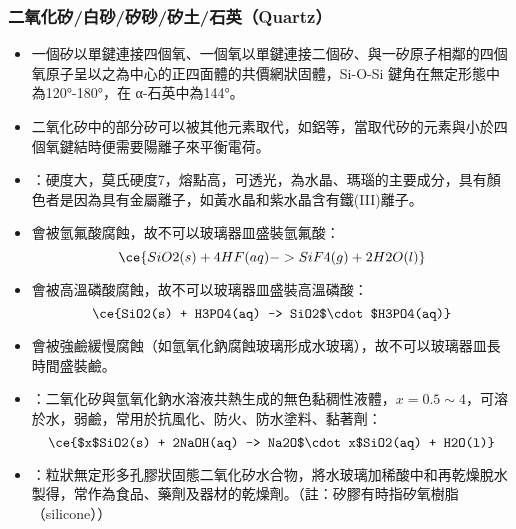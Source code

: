 \documentclass[a4paper,12pt]{report}
\begin{document}
\subsubsection{二氧化矽/白砂/矽砂/矽土/石英（Quartz）}
\begin{itemize}
\item 一個矽以單鍵連接四個氧、一個氧以單鍵連接二個矽、與一矽原子相鄰的四個氧原子呈以之為中心的正四面體的共價網狀固體，Si-O-Si 鍵角在無定形態中為120°-180°，在 α-石英中為144°。
\item 二氧化矽中的部分矽可以被其他元素取代，如鋁等，當取代矽的元素與小於四個氧鍵結時便需要陽離子來平衡電荷。
\item {}：硬度大，莫氏硬度7，熔點高，可透光，為水晶、瑪瑙的主要成分，具有顏色者是因為具有金屬離子，如黃水晶和紫水晶含有鐵(III)離子。
\item 會被氫氟酸腐蝕，故不可以玻璃器皿盛裝氫氟酸：
\[\ce{SiO2(s) + 4HF(aq) -> SiF4(g) + 2H2O(l)}\]
\item 會被高溫磷酸腐蝕，故不可以玻璃器皿盛裝高溫磷酸：
\[\ce{SiO2(s) + H3PO4(aq) -> SiO2$\cdot$H3PO4(aq)}\]
\item 會被強鹼緩慢腐蝕（如氫氧化鈉腐蝕玻璃形成水玻璃），故不可以玻璃器皿長時間盛裝鹼。
\item {}：二氧化矽與氫氧化鈉水溶液共熱生成的無色黏稠性液體，$x=0.5\sim 4$，可溶於水，弱鹼，常用於抗風化、防火、防水塗料、黏著劑：
\[\ce{$x$SiO2(s) + 2NaOH(aq) -> Na2O$\cdot x$SiO2(aq) + H2O(l)}\]
\item {}：粒狀無定形多孔膠狀固態二氧化矽水合物，將水玻璃加稀酸中和再乾燥脫水製得，常作為食品、藥劑及器材的乾燥劑。（註：矽膠有時指矽氧樹脂（silicone））
\end{itemize}
\end{document}
